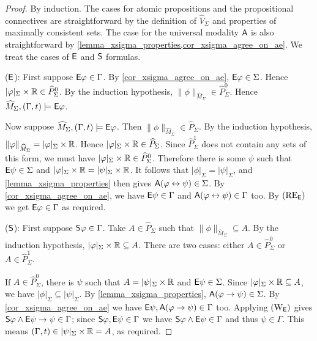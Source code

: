 \begin{proof}
    By induction. The cases for atomic propositions and
    the propositional connectives are straightforward by the definition of
    $\widehat{V}_\Sigma$ and properties of
    maximally consistent sets. The case for the universal modality $\A$ is also
    straightforward by \cref{lemma_xsigma_properties,cor_xsigma_agree_on_ae}.
    We treat the cases of $\E$ and $\S$
    formulas.

    ($\E$): First suppose $\E\phi \in \Gamma$. By
    \cref{cor_xsigma_agree_on_ae}, $\E\phi \in \Sigma$. Hence $|\phi|_\Sigma
    \times \R \in \widehat{P}_\Sigma^0$. By the induction hypothesis,
    $\|\phi\|_{\widehat{M}_\Sigma} \in \widehat{P}_\Sigma^0$. Hence
    $\widehat{M}_\Sigma, (\Gamma, t) \models \E\phi$.

    Now suppose $\widehat{M}_\Sigma, (\Gamma, t) \models \E\phi$. Then
    $\|\phi\|_{\widehat{M}_\Sigma} \in \widehat{P}_\Sigma$. By the induction
    hypothesis, $\|\phi\|_{\widehat{M}_\Sigma} = |\phi|_\Sigma \times \R$.
    Hence $|\phi|_\Sigma \times \R \in \widehat{P}_\Sigma$.  Since
    $\widehat{P}_\Sigma^1$ does not contain any sets of this form, we must have
    $|\phi|_\Sigma \times \R \in \widehat{P}_\Sigma^0$. Therefore there is some
    $\psi$ such that $\E\psi \in \Sigma$ and $|\phi|_\Sigma \times \R =
    |\psi|_\Sigma \times \R$.  It follows that $|\phi|_\Sigma = |\psi|_\Sigma$,
    and \cref{lemma_xsigma_properties} then gives $\A(\phi \liff \psi) \in
    \Sigma$. By \cref{cor_xsigma_agree_on_ae}, we have $\E\psi \in \Gamma$ and
    $\A(\phi \liff \psi) \in \Gamma$ too. By $\reE$ we get $\E\phi \in \Gamma$
    as required.

    ($\S$): First suppose $\S\phi \in \Gamma$. Take $A \in \widehat{P}_\Sigma$
    such that $\|\phi\|_{\widehat{M}_\Sigma} \subseteq A$. By the induction
    hypothesis, $|\phi|_\Sigma \times \R \subseteq A$. There are two cases:
    either $A \in \widehat{P}_\Sigma^0$ or $A \in \widehat{P}_\Sigma^1$.

    If $A \in \widehat{P}_\Sigma^0$, there is $\psi$ such that $A =
    |\psi|_\Sigma \times \R$ and $\E\psi \in \Sigma$.  Since $|\phi|_\Sigma
    \times \R \subseteq A$, we have $|\phi|_\Sigma \subseteq |\psi|_\Sigma$.
    By \cref{lemma_xsigma_properties}, $\A(\phi \limplies \psi) \in \Sigma$. By
    \cref{cor_xsigma_agree_on_ae} we have $\E\psi, \A(\phi \limplies \psi) \in
    \Gamma$ too. Applying $\weakeningE$ gives $\S\phi \land \E\psi \limplies
    \psi \in \Gamma$; since $\S\phi, \E\psi \in \Gamma$ we have $\S\phi \land
    \E\psi \in \Gamma$ and thus $\psi \in \Gamma$. This means $(\Gamma, t) \in
    |\psi|_\Sigma \times \R = A$, as required.


\end{proof}
